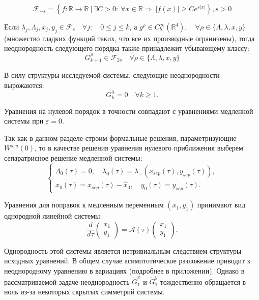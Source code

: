 \[
\mathcal{F}_{-s} = \left\{ f \colon \mathbb{R} \to \mathbb{R} \ \Big| \ \exists C > 0: \ \forall x \in \mathbb{R} \Rightarrow \ |f(x)| \geq C e^{s|x|} \right\}, s > 0
\]

Если $\lambda_j, \Lambda_j, x_j, y_j \in \mathcal{F}_s \quad \forall j: \quad 0 \le j \le k$, а $g^\rho \in C_b^{\infty} (\mathbb{R}^4), \quad \forall \rho \in \{\Lambda, \lambda,x,y \}$ (множество гладких функций таких, что все их производные ограничены), тогда неоднородность следующего порядка также принадлежит убывающему классу:
$$G_{k+1}^\rho \in \mathcal{F}_{2s} \quad \forall \rho \in \{\Lambda, \lambda,x,y \}$$

В силу структуры исследуемой системы, следующие неоднородности вырожаются:
$$G_k^\lambda = 0 \quad \forall k \ge 1.$$


Уравнения на нулевой порядок в точности совпадают с уравнениями медленной системы при $\varepsilon = 0$. 

Так как в данном разделе строим формальные решения, параметризующие $W^{s,u}(0)$, то в качестве решения уравнения нулевого приближения выберем сепаратрисное решение медленной системы:
\begin{equation*}
    \begin{cases}
        \Lambda_0(\tau) = 0, \quad
        \lambda_0(\tau) = \lambda_-(x_{sep}(\tau),y_{sep}(\tau)), \\
        x_0(\tau) = x_{sep}(\tau) - \hat x_0, \quad
        y_0(\tau) = y_{sep}(\tau).
    \end{cases}
\end{equation*}

Уравнения для поправок к медленным переменным $(x_1,y_1)$ принимают вид однородной линейной системы:
\begin{equation}
\frac{d}{d\tau} \begin{pmatrix} x_1 \\ y_1 \end{pmatrix} = \mathcal{A}(\tau) \begin{pmatrix} x_1 \\ y_1 \end{pmatrix}.
\label{utv_odnor}
\end{equation}

Однородность этой системы является нетривиальным следствием структуры исходных уравнений. В общем случае асимптотическое разложение приводит к неоднородному уравнению в вариациях (подробнее в приложении). Однако в рассматриваемой задаче неоднородность $\tilde G_1^x$ и $\tilde G_1^y$ тождественно обращается в ноль из-за некоторых скрытых симметрий системы.

